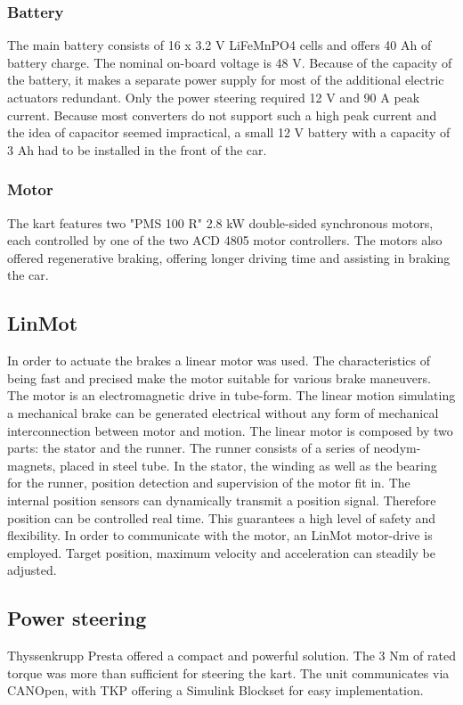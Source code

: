 \subsubsection{Battery}
The main battery consists of 16 x 3.2 V LiFeMnPO4 cells and offers 40 Ah of battery charge. The nominal on-board voltage is 48 V. Because of the capacity of the battery, it makes a separate power supply for most of the additional electric actuators redundant. Only the power steering required 12 V and 90 A peak current. Because most converters do not support such a high peak current and the idea of capacitor seemed impractical, a small 12 V battery with a capacity of 3 Ah had to be installed in the front of the car.

\subsubsection{Motor}
The kart features two "PMS 100 R" 2.8 kW double-sided synchronous motors, each controlled by one of the two ACD 4805 motor controllers. The motors also offered regenerative braking, offering longer driving time and assisting in braking the car.

\subsection{LinMot}
In order to actuate the brakes a linear motor was used. The characteristics of being fast and precised make the motor suitable for various brake maneuvers. The motor is an electromagnetic drive in tube-form. The linear motion simulating a mechanical brake can be generated electrical without any form of mechanical interconnection between motor and motion. The linear motor is composed by two parts: the stator and the runner. The runner consists of a series of neodym-magnets, placed in steel tube. In the stator, the winding as well as the bearing for the runner, position detection and supervision of the motor fit in.
The internal position sensors can dynamically transmit a position signal. Therefore position can be controlled real time. This guarantees a high level of safety and flexibility. 
In order to communicate with the motor, an LinMot motor-drive is employed. Target position, maximum velocity and acceleration can steadily be adjusted.


\subsection{Power steering}
Thyssenkrupp Presta offered a compact and powerful solution. The 3 Nm of rated torque was more than sufficient for steering the kart. The unit communicates via CANOpen, with TKP offering a Simulink Blockset for easy implementation. 

